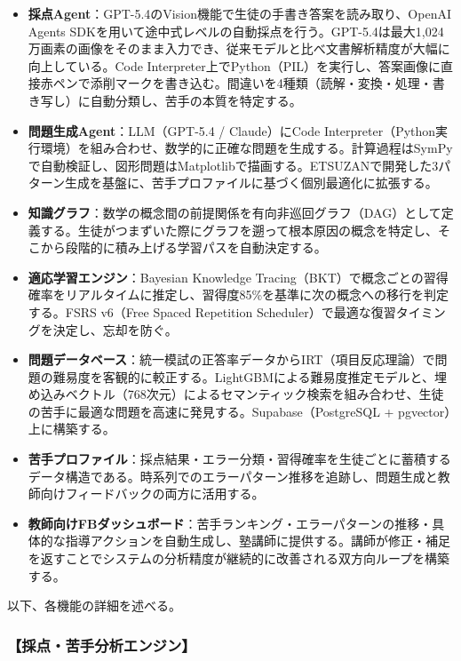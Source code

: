 \documentclass[paper=a4,fontsize=10.5bp,jafontsize=10.5bp]{jlreq}
\begin{document}
\begin{itemize}
  \item \textbf{採点Agent}：GPT-5.4のVision機能で生徒の手書き答案を読み取り、OpenAI Agents SDKを用いて途中式レベルの自動採点を行う。GPT-5.4は最大1,024万画素の画像をそのまま入力でき、従来モデルと比べ文書解析精度が大幅に向上している。Code Interpreter上でPython（PIL）を実行し、答案画像に直接赤ペンで添削マークを書き込む。間違いを4種類（読解・変換・処理・書き写し）に自動分類し、苦手の本質を特定する。

  \item \textbf{問題生成Agent}：LLM（GPT-5.4 / Claude）にCode Interpreter（Python実行環境）を組み合わせ、数学的に正確な問題を生成する。計算過程はSymPyで自動検証し、図形問題はMatplotlibで描画する。ETSUZANで開発した3パターン生成を基盤に、苦手プロファイルに基づく個別最適化に拡張する。

  \item \textbf{知識グラフ}：数学の概念間の前提関係を有向非巡回グラフ（DAG）として定義する。生徒がつまずいた際にグラフを遡って根本原因の概念を特定し、そこから段階的に積み上げる学習パスを自動決定する。

  \item \textbf{適応学習エンジン}：Bayesian Knowledge Tracing（BKT）で概念ごとの習得確率をリアルタイムに推定し、習得度85\%を基準に次の概念への移行を判定する。FSRS v6（Free Spaced Repetition Scheduler）で最適な復習タイミングを決定し、忘却を防ぐ。

  \item \textbf{問題データベース}：統一模試の正答率データからIRT（項目反応理論）で問題の難易度を客観的に較正する。LightGBMによる難易度推定モデルと、埋め込みベクトル（768次元）によるセマンティック検索を組み合わせ、生徒の苦手に最適な問題を高速に発見する。Supabase（PostgreSQL + pgvector）上に構築する。

  \item \textbf{苦手プロファイル}：採点結果・エラー分類・習得確率を生徒ごとに蓄積するデータ構造である。時系列でのエラーパターン推移を追跡し、問題生成と教師向けフィードバックの両方に活用する。

  \item \textbf{教師向けFBダッシュボード}：苦手ランキング・エラーパターンの推移・具体的な指導アクションを自動生成し、塾講師に提供する。講師が修正・補足を返すことでシステムの分析精度が継続的に改善される双方向ループを構築する。
\end{itemize}

以下、各機能の詳細を述べる。

\subsubsection{【採点・苦手分析エンジン】}
\end{document}
